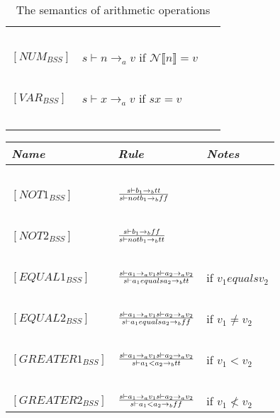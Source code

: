 \begin{table}[H]
\begin{tabular}{|l|l|l|}
			~			&															~																			& ~ \\
	$[NUM_{BSS}]$		& $s \vdash n \rightarrow_{a} v$  if  $\mathcal{N}\llbracket n \rrbracket = v$															& ~ \\
			~			&															~																			& ~ \\
	$[VAR_{BSS}]$		& $s \vdash x \rightarrow_{a} v$  if  $sx = v$														   									& ~ \\
			~			&															~																			& ~ \\
	\hline
	\end{tabular}
	\label{tab:semantics_aritmethic}
	\caption{The semantics of arithmetic operations}
\end{table}

\begin{table}[H]
	\begin{tabular}{|l|l|l|}
	\hline
	\emph{Name}			& \emph{Rule}																															& \emph{Notes} \\ \hline
			~			&															~																			& ~ \\
	$[NOT1_{BSS}]$		& $s \vdash b_{1} \rightarrow_{b} tt \over s \vdash not b_{1} \rightarrow_{b} ff$														& ~ \\
			~			&															~																			& ~ \\
	$[NOT2_{BSS}]$		& $s \vdash b_{1} \rightarrow_{b} ff \over s \vdash not b_{1} \rightarrow_{b} tt$														& ~ \\
			~			&															~																			& ~ \\
	$[EQUAL1_{BSS}]$	& $s \vdash a_{1} \rightarrow_{a} v_{1}  s \vdash a_{2} \rightarrow_{a} v_{2} \over s \vdash a_{1} equals a_{2} \rightarrow_{b} tt$		& if $v_{1} equals v_{2}$ \\
			~			&															~																			& ~ \\
	$[EQUAL2_{BSS}]$	& $s \vdash a_{1} \rightarrow_{a} v_{1}  s \vdash a_{2} \rightarrow_{a} v_{2} \over s \vdash a_{1} equals a_{2} \rightarrow_{b} ff$		& if $v_{1} \ne v_{2}$ \\
			~			&															~																			& ~ \\
	$[GREATER1_{BSS}]$	& $s \vdash a_{1} \rightarrow_{a} v_{1}  s \vdash a_{2} \rightarrow_{a} v_{2} \over s \vdash a_{1} < a_{2} \rightarrow_{b} tt$			& if $v_{1} < v_{2}$ \\
			~			&															~																			& ~ \\
	$[GREATER2_{BSS}]$	& $s \vdash a_{1} \rightarrow_{a} v_{1}  s \vdash a_{2} \rightarrow_{a} v_{2} \over s \vdash a_{1} < a_{2} \rightarrow_{b} ff$			& if $v_{1} \not< v_{2}$ \\

\end{tabular}
\end{table}

